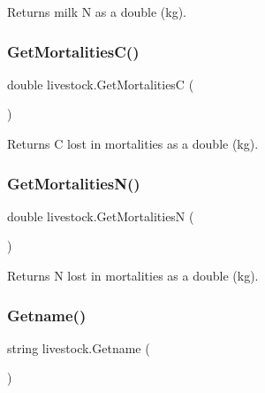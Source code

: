 Returns milk N as a double (kg). 

\mbox{\label{classlivestock_aaf097ac16bc2a1ed7751dcc59d4f62fe}} 
\subsubsection{\texorpdfstring{GetMortalitiesC()}{GetMortalitiesC()}}
{\footnotesize\ttfamily double livestock.\+Get\+MortalitiesC (\begin{DoxyParamCaption}{ }\end{DoxyParamCaption})\hspace{0.3cm}{\ttfamily [inline]}}



Returns C lost in mortalities as a double (kg). 

\mbox{\label{classlivestock_a3ee0a1109aafb75b7d056a93b04685fb}} 
\subsubsection{\texorpdfstring{GetMortalitiesN()}{GetMortalitiesN()}}
{\footnotesize\ttfamily double livestock.\+Get\+MortalitiesN (\begin{DoxyParamCaption}{ }\end{DoxyParamCaption})\hspace{0.3cm}{\ttfamily [inline]}}



Returns N lost in mortalities as a double (kg). 

\mbox{\label{classlivestock_a2658697a2991be8744dbbf6d366cf5dd}} 
\subsubsection{\texorpdfstring{Getname()}{Getname()}}
{\footnotesize\ttfamily string livestock.\+Getname (\begin{DoxyParamCaption}{ }\end{DoxyParamCaption})\hspace{0.3cm}{\ttfamily [inline]}}



